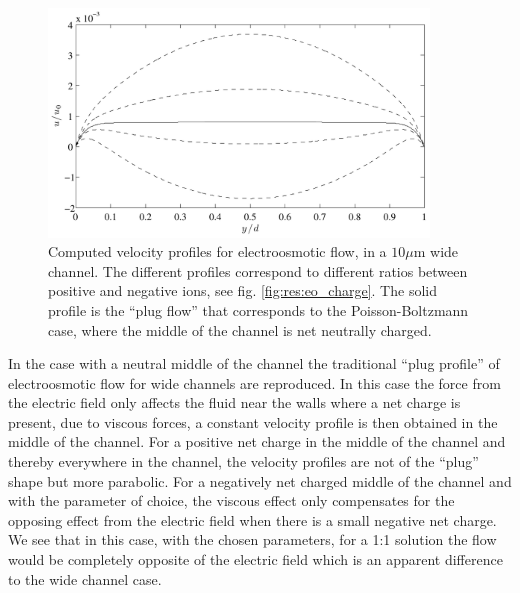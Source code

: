 \begin{figure}
\begin{center}
\includegraphics[width=0.9\textwidth]{fig/eo_u.pdf}
\end{center}
\caption[Computed velocity profiles for electroosmotic flow.]{Computed
  velocity profiles for electroosmotic flow, in a $10 \mu$m wide
  channel. The different profiles correspond to different ratios
  between positive and negative ions, see
  fig. \ref{fig:res:eo_charge}. The solid profile is the ``plug flow''
  that corresponds to the Poisson-Boltzmann case, where the middle of
  the channel is net neutrally charged.}
\label{fig:res:eo_u}
\end{figure}

In the case with a neutral middle of the channel the traditional
``plug profile'' of electroosmotic flow for wide channels are
reproduced. In this case the force from the electric field only
affects the fluid near the walls where a net charge is present, due to
viscous forces, a constant velocity profile is then obtained in the
middle of the channel. For a positive net charge in the middle of the
channel and thereby everywhere in the channel, the velocity profiles
are not of the ``plug'' shape but more parabolic. For a negatively net
charged middle of the channel and with the parameter of choice, the
viscous effect only compensates for the opposing effect from the
electric field when there is a small negative net charge. We see that
in this case, with the chosen parameters, for a 1:1 solution the flow
would be completely opposite of the electric field which is an
apparent difference to the wide channel case.
